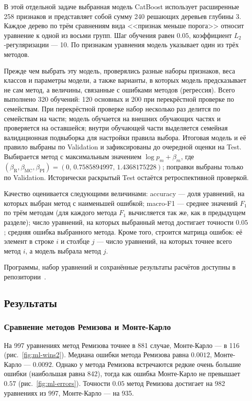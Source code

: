 \documentclass[14pt,a4paper]{extarticle}
\begin{document}
В этой отдельной задаче выбранная модель CatBoost использует
расширенные 258 признаков и представляет собой сумму
240 решающих деревьев глубины 3. Каждое дерево по трём сравнениям вида
<<признак меньше порога>> относит уравнение к одной из восьми групп.
Шаг обучения равен $0.05$, коэффициент $L_2$-регуляризации --- 10.
По признакам уравнения модель указывает один из трёх методов.

Прежде чем выбрать эту модель, проверялись разные наборы признаков,
веса классов и параметры модели, а также варианты, в которых модель
предсказывает не сам метод, а величины, связанные с ошибками методов
(регрессия). Всего выполнено 320 обучений: 120 основных и 200
при перекрёстной проверке по семействам. При перекрёстной проверке
набор несколько раз делится по семействам на части; модель обучается
на внешних обучающих частях и проверяется на оставшейся; внутри
обучающей части выделяется семейная валидационная подвыборка
для настройки правила выбора. Итоговая модель и её правило выбраны
по Validation и зафиксированы до очередной оценки на Test.
Выбирается метод с максимальным значением $\log p_m+\beta_m$,
где $(\beta_{\mathrm R},\beta_{\mathrm{MC}},\beta_{\mathrm{PI}})
=(0,\,0.7585894997,\,1.4368175228)$; поправки выбраны
только по Validation. Исторически раскрытый Test
остаётся ретроспективной проверкой.

Качество оценивается следующими величинами: accuracy --- доля уравнений,
на которых выбран метод с наименьшей ошибкой; macro-F1 --- среднее
значений $F_1$ по трём методам (для каждого метода $F_1$ вычисляется так
же, как в предыдущем разделе); число уравнений, на которых выбранный
метод достигает точности $0.05$; средняя ошибка выбранного метода.
Кроме того, строится матрица ошибок: её элемент в строке $i$ и столбце
$j$ --- число уравнений, на которых точнее всего метод $i$, а модель
выбрала метод $j$.

Программы, набор уравнений и сохранённые результаты расчётов доступны
в репозитории~\cite{repo2488}.

\subsection{Результаты}
\subsubsection{Сравнение методов Ремизова и Монте-Карло}
На 997 уравнениях метод Ремизова точнее в 881 случае, Монте-Карло ---
в 116 (рис.~\ref{fig:ml-wins2}). Медиана ошибки метода Ремизова равна
$0.0012$, Монте-Карло --- $0.0092$. Однако у метода Ремизова встречаются
редкие очень большие ошибки (наибольшая равна 842), тогда как ошибка
Монте-Карло не превышает $0.57$ (рис.~\ref{fig:ml-errors}). Точности
$0.05$ метод Ремизова достигает на 982 уравнениях из 997,
Монте-Карло --- на 935.
\end{document}
